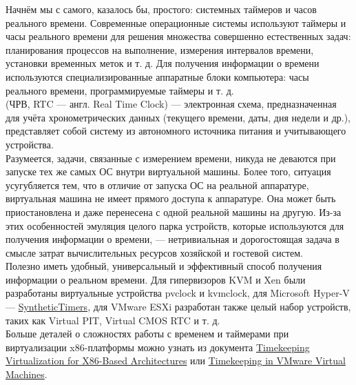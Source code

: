 \documentclass[14pt, a4paper]{article}
\begin{document}
Начнём мы с самого, казалось бы, простого: системных таймеров и часов реального времени.
Современные операционные системы используют таймеры и часы реального времени для решения
множества совершенно естественных задач: планирования процессов на выполнение, измерения
интервалов времени, установки временных меток и т. д. Для получения информации о времени
используются специализированные аппаратные блоки компьютера: часы реального времени,
программируемые таймеры и т. д.\\

\href{https://ru.wikipedia.org/wiki/Часы_реального_времени}{} (ЧРВ, RTC — англ. Real Time Clock) — электронная схема, предназначенная
для учёта хронометрических данных (текущего времени, даты, дня недели и др.), представляет собой
систему из автономного источника питания и учитывающего устройства.\\

Разумеется, задачи, связанные с измерением времени, никуда не деваются при запуске тех же самых
ОС внутри виртуальной машины. Более того, ситуация усугубляется тем, что в отличие от запуска ОС
на реальной аппаратуре, виртуальная машина не имеет прямого доступа к аппаратуре. Она может
быть приостановлена и даже перенесена с одной реальной машины на другую. Из-за этих
особенностей эмуляция целого парка устройств, которые используются для получения информации о
времени, — нетривиальная и дорогостоящая задача в смысле затрат вычислительных ресурсов
хозяйской и гостевой систем.\\

Полезно иметь удобный, универсальный и эффективный способ получения информации о реальном
времени. Для гипервизоров KVM и Xen были разработаны виртуальные устройства pvclock и
kvmclock, для Microsoft Hyper-V — \href{https://github.com/MicrosoftDocs/Virtualization-Documentation/raw/master/tlfs/Hypervisor%20Top%20Level%20Functional%20Specification%20v5.0C.pdf}{SyntheticTimers}, 
для VMware ESXi разработан также целый набор
устройств, таких как Virtual PIT, Virtual CMOS RTC и т. д.\\

Больше деталей о сложностях работы с временем и таймерами при виртуализации x86-платформы
можно узнать из документа \href{https://www.kernel.org/doc/Documentation/virtual/kvm/timekeeping.txt}{Timekeeping Virtualization for X86-Based Architectures} 
или \href{https://github.com/MicrosoftDocs/Virtualization-Documentation/raw/master/tlfs/Hypervisor%20Top%20Level%20Functional%20Specification%20v5.0C.pdf}{Timekeeping in VMware Virtual Machines}.\\
\end{document}
